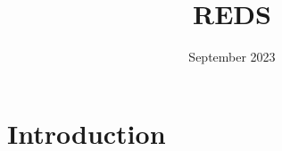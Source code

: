 \documentclass{article}
\title{REDS}
\author{}
\date{September 2023}
\begin{document}
\maketitle

\section{Introduction}
\end{document}
